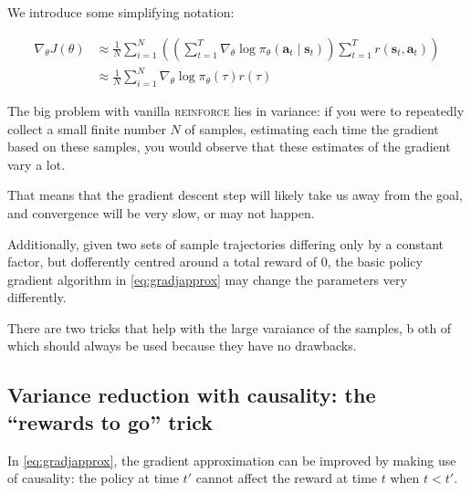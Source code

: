 \documentclass{article}
\begin{document}
We introduce some simplifying notation:

\begin{subequations}
  \begin{align}
    \nabla_\theta J(\theta) 
        &\approx \frac{1}{N} \sum_{i=1}^N\left(\left(\sum_{t=1}^T\nabla_\theta\log\pi_\theta\left(\mathbf{a}_t\mid \mathbf{s}_t\right)\right) \sum_{t=1}^T r\left(\mathbf{s}_t,\mathbf{a}_t\right)\right)\\
        &\approx \frac{1}{N} \sum_{i=1}^N\nabla_\theta\log\pi_\theta\left(\tau\right)r\left(\tau\right)
  \end{align}
\end{subequations}

The big problem with vanilla \textsc{reinforce} lies in variance: if you were to repeatedly collect a small finite number $N$ of samples, estimating each time the gradient based on these samples, you would observe that these estimates of the gradient vary a lot.

That means that the gradient descent step will likely take us away from the goal, and convergence will be very slow, or may not happen.

Additionally, given two sets of sample trajectories differing only by a constant factor, but dofferently centred around a total reward of 0, the basic policy gradient algorithm in \eqref{eq:gradjapprox} may change the parameters very differently. 


There are two tricks that help with the large varaiance of the samples, b oth of which should always be used because they have no drawbacks.

\subsection{Variance reduction with causality: the ``rewards to go'' trick}

In \eqref{eq:gradjapprox}, the gradient approximation can be improved by making use of causality: the policy at time $t'$ cannot affect the reward at time $t$ when $t < t'$.
\end{document}
